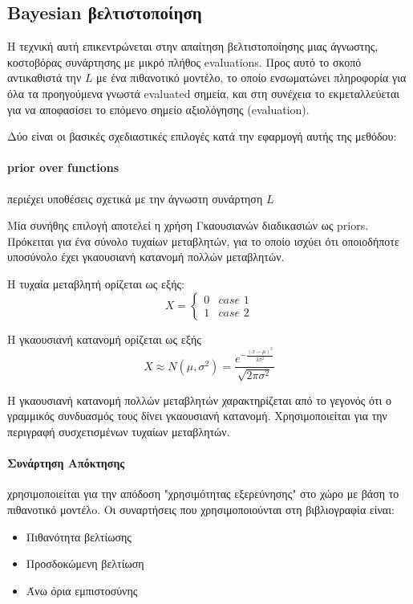 \documentclass[]{article}
\numberwithin{equation}{section}		%
\numberwithin{figure}{section}			%
\numberwithin{table}{section}				%
\begin{document}
	\subsection{Bayesian βελτιστοποίηση}
	Η τεχνική αυτή επικεντρώνεται στην απαίτηση βελτιστοποίησης μιας άγνωστης, κοστοβόρας συνάρτησης με μικρό πλήθος evaluations. Προς αυτό το σκοπό αντικαθιστά την $L$ με ένα πιθανοτικό μοντέλο, το οποίο ενσωματώνει πληροφορία για όλα τα προηγούμενα γνωστά evaluated σημεία, και στη συνέχεια το εκμεταλλεύεται για να αποφασίσει το επόμενο σημείο αξιολόγησης (evaluation).
	
	Δύο είναι οι βασικές σχεδιαστικές επιλογές κατά την εφαρμογή αυτής της μεθόδου: 
	
	\paragraph{prior over functions} περιέχει υποθέσεις σχετικά με την άγνωστη συνάρτηση $L$
	
	Μία συνήθης επιλογή \citep{practical} αποτελεί η χρήση Γκαουσιανών διαδικασιών ως priors. Πρόκειται για ένα σύνολο τυχαίων μεταβλητών, για το οποίο ισχύει ότι οποιοδήποτε υποσύνολο έχει γκαουσιανή κατανομή πολλών μεταβλητών. 
	
	Η τυχαία μεταβλητή ορίζεται ως εξής:
	\begin{equation}
		X=
		\begin{cases}
			0 & \textit{case 1}\\
			1 & \textit{case 2}
		\end{cases}
	\end{equation} 
	
	Η γκαουσιανή κατανομή ορίζεται ως εξής
	\begin{equation}
		X \approx N (\mu, \sigma^2) = \frac{e^{-\frac{(x-\mu)^2}{2\sigma^2}}}{\sqrt{2\pi\sigma^2}}
	\end{equation}
	
	Η γκαουσιανή κατανομή πολλών μεταβλητών χαρακτηρίζεται από το γεγονός ότι ο γραμμικός συνδυασμός τους δίνει γκαουσιανή κατανομή. Χρησιμοποιείται για την περιγραφή συσχετισμένων τυχαίων μεταβλητών.
	
	\paragraph{Συνάρτηση Απόκτησης} χρησιμοποιείται για την απόδοση "χρησιμότητας εξερεύνησης" στο χώρο με βάση το πιθανοτικό μοντέλo. Οι συναρτήσεις που χρησιμοποιούνται στη βιβλιογραφία είναι:
	\begin{itemize}
		\item Πιθανότητα βελτίωσης
		\item Προσδοκώμενη βελτίωση
		\item Άνω όρια εμπιστοσύνης
	\end{itemize}
	
\end{document}
